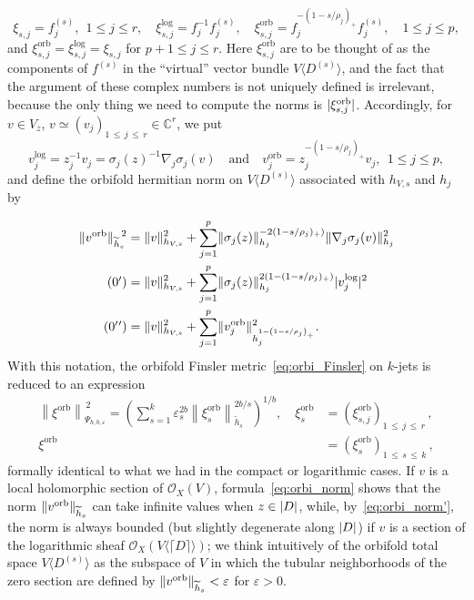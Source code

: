 \documentclass[AHL,Unicode,longabstracts,published]{cedram}
\DeclarePairedDelimiter{\abs}{\lvert}{\rvert}
\DeclarePairedDelimiter{\Abs}{\lVert}{\rVert}
\newcommand*\orb{\mathrm{orb}}
\newcommand*\cO{\mathcal{O}}
\newcommand*\bC{\mathbb{C}}
\let\leq\leqslant
\begin{document}
\[
\xi_{s,j}=f_j^{(s)},~~1\leq j\leq r,\quad
\xi^{\log}_{s,j}=f_j^{-1}f_j^{(s)},\quad
\xi^\orb_{s,j}=f_j^{-(1-s/\rho_j)_+}f_j^{(s)},\quad 1\leq j\leq p,
\]
and $\xi^\orb_{s,j}=\xi^{\log}_{s,j}=\xi_{s,j}$ for $p+1\leq j\leq r$. Here $\xi^\orb_{s,j}$ are to be thought of as the components of $f^{(s)}$ in the ``virtual'' vector bundle $V\langle D^{(s)}\rangle$, and the fact that the argument of these complex numbers is not uniquely defined is irrelevant, because the only thing we need to compute the norms is $\abs{\xi^\orb_{s,j}}$. Accordingly, for
$v\in V_z$, $v\simeq(v_j)_{1\,\leq\,j\,\leq\,r}\in\bC^r$, we put
\[
v^{\log}_j=z_j^{-1}v_j=\sigma_j(z)^{-1}\nabla_j\sigma_j(v)\quad\text{and}\quad v^\orb_j=z_j^{-(1-s/\rho_j)_+}v_j,~~1\leq j\leq p,
\]
and define the orbifold hermitian norm on $V\langle D^{(s)}\rangle$ associated with $h_{V,s}$ and $h_j$ by

\begin{align}\label{eq:orbi_norm}
\Abs{v^\orb}_{\widetilde h_s}{\kern-3pt}^2&=\Abs{v}_{h_{V,s}}^2 +\sum_{j=1}^p\Abs{\sigma_j(z)}_{h_j}^{-2\left(1-s/\rho_j)_+\right)}
\Abs{\nabla_j\sigma_j(v)}_{h_j}^2
\\\label{eq:orbi_norm'}
\tag{\theequation\ensuremath{'}} &=\Abs{v}_{h_{V,s}}^2+\sum_{j=1}^p
\Abs{\sigma_j(z)}_{h_j}^{2\left(1-(1-s/\rho_j)_+\right)}\abs{v_j^{\log}}^2
\\\label{eq:orbi_norm''}
\tag{\theequation\ensuremath{'}\ensuremath{'}} &=\Abs{v}_{h_{V,s}}^2+
\sum_{j=1}^p\Abs{v_j^\orb}_{h_j^{1-\left(1-s/\rho_j\right)_+}}^2.
\end{align}
With this notation, the orbifold Finsler metric~\eqref{eq:orbi_Finsler} on $k$-jets is reduced to an expression
\begin{equation}\label{eq:orbi_Finsler'}
\begin{split}
\left\|\xi^\orb\right\|_{\Psi_{h,b,\varepsilon}}^{\,2\phantom{\big|}}=
\left(
\sum_{s=1}^k
\varepsilon_s^{2b}
\left\|\xi_s^\orb\right\|_{\widetilde h_s}^{2b/s}
\right)^{1/b},
\quad\xi_s^\orb &=\left(\xi_{s,j}^\orb\right)_{1\,\leq\,j\,\leq\,r}\,,\\
\xi^\orb &=\left(\xi_s^\orb\right)_{1\,\leq\,s\,\leq\,k}\,,
\end{split}
\end{equation}
formally identical to what we had in the compact or logarithmic cases. If $v$ is a local holomorphic section of $\cO_X(V)$, formula~\eqref{eq:orbi_norm} shows that the norm
$\Abs{v^\orb}_{\widetilde h_s}$ can take infinite values when $z\in\abs{D}$, while, by~\eqref{eq:orbi_norm'}, the norm is always bounded (but slightly degenerate along
$\abs{D}$) if $v$ is a section of the logarithmic sheaf
$\cO_X(V\langle\lceil D\rceil\rangle)$; we think intuitively of the orbifold total space $V\langle D^{(s)}\rangle$ as the subspace of $V$ in which the tubular neighborhoods of the zero section are defined by $\Abs{v^\orb}_{\widetilde h_s}<\varepsilon$ for $\varepsilon>0$.
\end{document}
